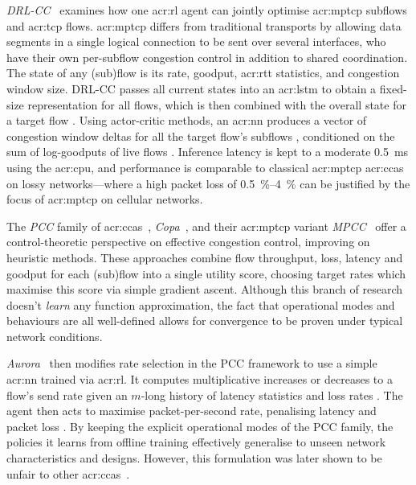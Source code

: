 \emph{DRL-CC}~\parencite{DBLP:journals/jsac/XuTYWX19} examines how one \gls{acr:rl} agent can jointly optimise \gls{acr:mptcp} subflows and \gls{acr:tcp} flows.
\gls{acr:mptcp} differs from traditional transports by allowing data segments in a single logical connection to be sent over several interfaces, who have their own per-subflow congestion control in addition to shared coordination.
The state of any (sub)flow is its rate, goodput, \gls{acr:rtt} statistics, and congestion window size.
DRL-CC passes all current states into an \gls{acr:lstm} to obtain a fixed-size representation for all flows, which is then combined with the overall state for a target flow \prllitstate.
Using actor-critic methods, an \gls{acr:nn} produces a vector of congestion window deltas for all the target flow's subflows \prllitactreal, conditioned on the sum of log-goodputs of live flows \prllitreward.
Inference latency is kept to a moderate \qty{0.5}{\milli\second} using the \gls{acr:cpu}, and performance is comparable to classical \gls{acr:mptcp} \glspl{acr:cca} on lossy networks---where a high packet loss of \qtyrange{0.5}{4}{\percent} can be justified by the focus of \gls{acr:mptcp} on cellular networks.

The \emph{PCC} family of \glspl{acr:cca}~\parencite{DBLP:conf/nsdi/DongLZGS15,DBLP:conf/nsdi/DongMZAGGS18}, \emph{Copa}~\parencite{DBLP:conf/nsdi/ArunB18}, and their \gls{acr:mptcp} variant \emph{MPCC}~\parencite{DBLP:conf/conext/GiladSGRS20} offer a control-theoretic perspective on effective congestion control, improving on heuristic methods.
These approaches combine flow throughput, loss, latency and goodput for each (sub)flow into a single utility score, choosing target rates which maximise this score via simple gradient ascent.
Although this branch of research doesn't \emph{learn} any function approximation, the fact that operational modes and behaviours are all well-defined allows for convergence to be proven under typical network conditions.

\emph{Aurora}~\parencite{DBLP:conf/icml/JayRGST19} then modifies rate selection in the PCC framework to use a simple \gls{acr:nn} trained via \gls{acr:rl}.
It computes multiplicative increases or decreases to a flow's send rate \prllitactreal{} given an $m$-long history of latency statistics and loss rates \prllitstate.
The agent then acts to maximise packet-per-second rate, penalising latency and packet loss \prllitreward.
By keeping the explicit operational modes of the PCC family, the policies it learns from offline training effectively generalise to unseen network characteristics and designs.
However, this formulation was later shown to be unfair to other \glspl{acr:cca}~\parencite{DBLP:conf/sigcomm/AbbaslooYC20}.

